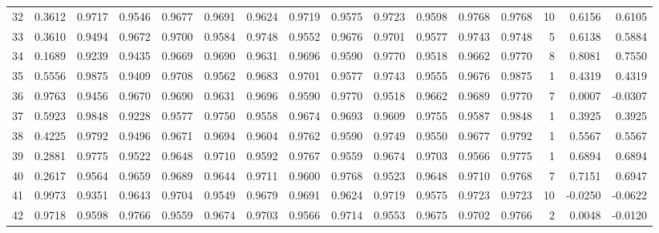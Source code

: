 \begin{tabular}{lrrrrrrrrrrrrrrr}
32  &      0.3612 &  0.9717 &  0.9546 &  0.9677 &  0.9691 &  0.9624 &  0.9719 &  0.9575 &  0.9723 &  0.9598 &   0.9768 &     0.9768 &     10 &                    0.6156 &                     0.6105 \\
33  &      0.3610 &  0.9494 &  0.9672 &  0.9700 &  0.9584 &  0.9748 &  0.9552 &  0.9676 &  0.9701 &  0.9577 &   0.9743 &     0.9748 &      5 &                    0.6138 &                     0.5884 \\
34  &      0.1689 &  0.9239 &  0.9435 &  0.9669 &  0.9690 &  0.9631 &  0.9696 &  0.9590 &  0.9770 &  0.9518 &   0.9662 &     0.9770 &      8 &                    0.8081 &                     0.7550 \\
35  &      0.5556 &  0.9875 &  0.9409 &  0.9708 &  0.9562 &  0.9683 &  0.9701 &  0.9577 &  0.9743 &  0.9555 &   0.9676 &     0.9875 &      1 &                    0.4319 &                     0.4319 \\
36  &      0.9763 &  0.9456 &  0.9670 &  0.9690 &  0.9631 &  0.9696 &  0.9590 &  0.9770 &  0.9518 &  0.9662 &   0.9689 &     0.9770 &      7 &                    0.0007 &                    -0.0307 \\
37  &      0.5923 &  0.9848 &  0.9228 &  0.9577 &  0.9750 &  0.9558 &  0.9674 &  0.9693 &  0.9609 &  0.9755 &   0.9587 &     0.9848 &      1 &                    0.3925 &                     0.3925 \\
38  &      0.4225 &  0.9792 &  0.9496 &  0.9671 &  0.9694 &  0.9604 &  0.9762 &  0.9590 &  0.9749 &  0.9550 &   0.9677 &     0.9792 &      1 &                    0.5567 &                     0.5567 \\
39  &      0.2881 &  0.9775 &  0.9522 &  0.9648 &  0.9710 &  0.9592 &  0.9767 &  0.9559 &  0.9674 &  0.9703 &   0.9566 &     0.9775 &      1 &                    0.6894 &                     0.6894 \\
40  &      0.2617 &  0.9564 &  0.9659 &  0.9689 &  0.9644 &  0.9711 &  0.9600 &  0.9768 &  0.9523 &  0.9648 &   0.9710 &     0.9768 &      7 &                    0.7151 &                     0.6947 \\
41  &      0.9973 &  0.9351 &  0.9643 &  0.9704 &  0.9549 &  0.9679 &  0.9691 &  0.9624 &  0.9719 &  0.9575 &   0.9723 &     0.9723 &     10 &                   -0.0250 &                    -0.0622 \\
42  &      0.9718 &  0.9598 &  0.9766 &  0.9559 &  0.9674 &  0.9703 &  0.9566 &  0.9714 &  0.9553 &  0.9675 &   0.9702 &     0.9766 &      2 &                    0.0048 &                    -0.0120 \\

\end{tabular}
